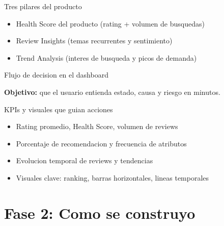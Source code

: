 \documentclass[aspectratio=169]{beamer}
\begin{document}
\begin{frame}{Tres pilares del producto}
  \begin{itemize}
    \item Health Score del producto (rating + volumen de busquedas)
    \item Review Insights (temas recurrentes y sentimiento)
    \item Trend Analysis (interes de busqueda y picos de demanda)
  \end{itemize}
\end{frame}

\begin{frame}{Flujo de decision en el dashboard}
  \begin{center}
  \end{center}
  \vspace{0.2cm}
  \textbf{Objetivo:} que el usuario entienda estado, causa y riesgo en minutos.
\end{frame}

\begin{frame}{KPIs y visuales que guian acciones}
  \begin{itemize}
    \item Rating promedio, Health Score, volumen de reviews
    \item Porcentaje de recomendacion y frecuencia de atributos
    \item Evolucion temporal de reviews y tendencias
    \item Visuales clave: ranking, barras horizontales, lineas temporales
  \end{itemize}
\end{frame}

\section{Fase 2: Como se construyo}
\end{document}
